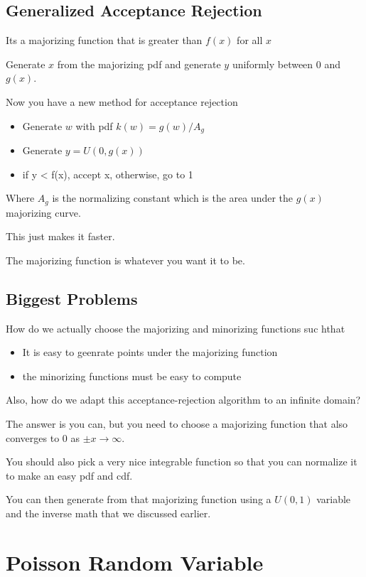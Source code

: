 \documentclass[fleqn]{report}
\begin{document}
\subsection{Generalized Acceptance Rejection}
Its a majorizing function that is greater than $f(x)$ for all $x$ 

Generate $x$ from the majorizing pdf and generate $y$ uniformly between 
0 and $g(x)$. 

Now you have a new method for acceptance rejection 

\begin{itemize}
    \item 
    Generate $w$ with pdf $k(w) = g(w) / A_g$ 
    \item 
    Generate $y = U(0, g(x))$
    \item 
    if y < f(x), accept x, otherwise, go to 1
\end{itemize}
Where $A_g$ is the normalizing constant which is the area under the $g(x)$ 
majorizing curve. 

This just makes it faster.

The majorizing function is whatever you want it to be. 

\subsection{Biggest Problems}
How do we actually choose the majorizing and minorizing functions suc hthat 

\begin{itemize}
    \item 
    It is easy to geenrate points under the majorizing function 
    \item 
    the minorizing functions must be easy to compute 
\end{itemize}

Also, how do we adapt this acceptance-rejection algorithm to an infinite domain?

The answer is you can, but you need to choose a majorizing function that 
also converges to 0 as $\pm x \to \infty$.

You should also pick a very nice integrable function so that you can 
normalize it to make an easy pdf and cdf. 

You can then generate from that majorizing function using a $U(0, 1)$ 
variable and the inverse math that we discussed earlier. 

\section{Poisson Random Variable}
\end{document}
